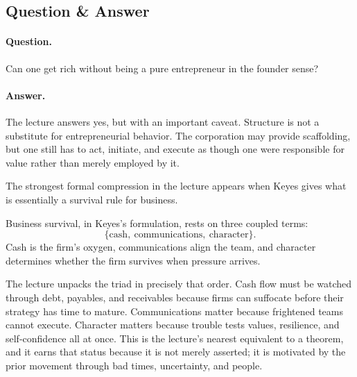 \subsection{Question \& Answer}

\paragraph{Question.} Can one get rich without being a pure entrepreneur in the founder sense?

\paragraph{Answer.} The lecture answers yes, but with an important caveat. Structure is not a substitute for entrepreneurial behavior. The corporation may provide scaffolding, but one still has to act, initiate, and execute as though one were responsible for value rather than merely employed by it.

The strongest formal compression in the lecture appears when Keyes gives what is essentially a survival rule for business.

\begin{proposition}
Business survival, in Keyes's formulation, rests on three coupled terms:
\begin{equation}
\{\text{cash},\ \text{communications},\ \text{character}\}.
\end{equation}
Cash is the firm's oxygen, communications align the team, and character determines whether the firm survives when pressure arrives.
\end{proposition}

\begin{figure}
\begin{center}
\end{center}
\end{figure}

The lecture unpacks the triad in precisely that order. Cash flow must be watched through debt, payables, and receivables because firms can suffocate before their strategy has time to mature. Communications matter because frightened teams cannot execute. Character matters because trouble tests values, resilience, and self-confidence all at once. This is the lecture's nearest equivalent to a theorem, and it earns that status because it is not merely asserted; it is motivated by the prior movement through bad times, uncertainty, and people.

